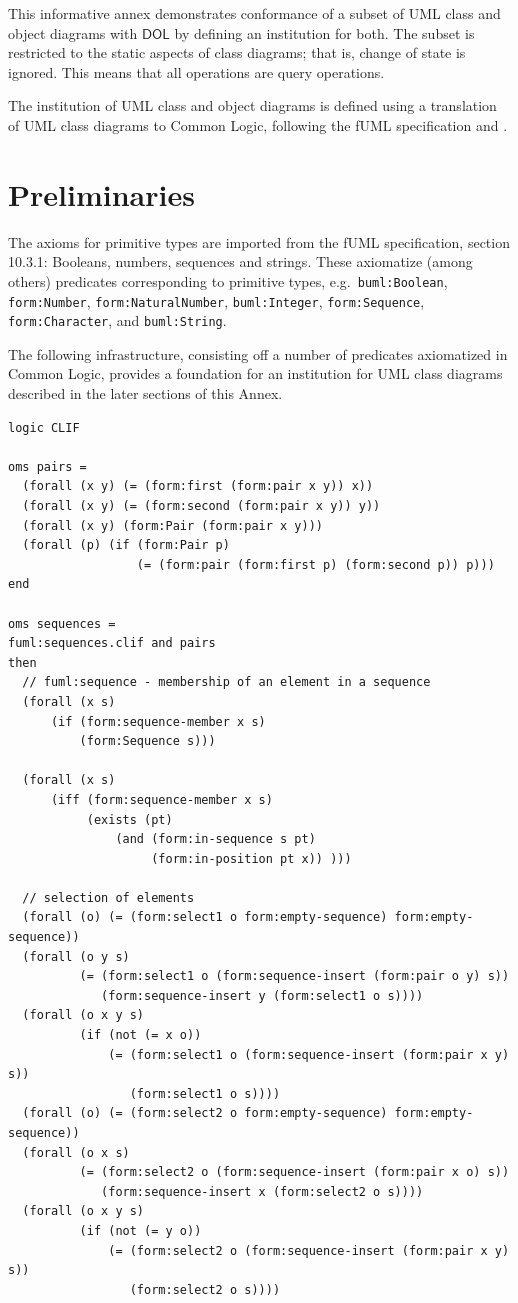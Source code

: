 \documentclass[10pt,fleqn,final]{scrreprt}
\newcommand*{\DOL}{\ensuremath{\mathsf{DOL}}\xspace}
\newenvironment{definitions}[0]{\medskip }{}
\begin{document}
\begin{definitions}
This informative annex demonstrates conformance of a subset of UML class and
object diagrams with \DOL by defining an institution for both.  The subset is restricted to the
 static aspects of class diagrams; that is, change
of state is ignored. This means that all operations are query
operations.

The institution of UML class and object diagrams is defined using a
translation of UML class diagrams to Common Logic, following the fUML
specification and \cite{Seidewitz08}.

\section{Preliminaries}

 The axioms for primitive types
are imported from the fUML specification, section 10.3.1:
Booleans, numbers, sequences and strings.  These
axiomatize (among others) predicates corresponding to primitive types,
e.g.\ \texttt{buml:Boolean}, \texttt{form:Number},
\texttt{form:NaturalNumber}, \texttt{buml:Integer},
\texttt{form:Sequence}, \texttt{form:Character}, and
\texttt{buml:String}.


The following infrastructure, consisting off a number of predicates axiomatized in Common Logic,
provides a foundation for an institution for UML class diagrams described in the later sections of
this Annex. 


\begin{lstlisting}[language=clif,morekeywords={then,with,logic,oms,end},mathescape]
logic CLIF

oms pairs =
  (forall (x y) (= (form:first (form:pair x y)) x))
  (forall (x y) (= (form:second (form:pair x y)) y))
  (forall (x y) (form:Pair (form:pair x y)))
  (forall (p) (if (form:Pair p)
                  (= (form:pair (form:first p) (form:second p)) p)))
end

oms sequences =
fuml:sequences.clif and pairs
then
  // fuml:sequence - membership of an element in a sequence
  (forall (x s)
      (if (form:sequence-member x s)
          (form:Sequence s)))

  (forall (x s)
      (iff (form:sequence-member x s)
           (exists (pt) 
               (and (form:in-sequence s pt)
                    (form:in-position pt x)) )))

  // selection of elements
  (forall (o) (= (form:select1 o form:empty-sequence) form:empty-sequence))
  (forall (o y s)
          (= (form:select1 o (form:sequence-insert (form:pair o y) s)) 
             (form:sequence-insert y (form:select1 o s))))
  (forall (o x y s)
          (if (not (= x o))
              (= (form:select1 o (form:sequence-insert (form:pair x y) s)) 
                 (form:select1 o s))))
  (forall (o) (= (form:select2 o form:empty-sequence) form:empty-sequence))
  (forall (o x s)
          (= (form:select2 o (form:sequence-insert (form:pair x o) s)) 
             (form:sequence-insert x (form:select2 o s))))
  (forall (o x y s)
          (if (not (= y o))
              (= (form:select2 o (form:sequence-insert (form:pair x y) s)) 
                 (form:select2 o s))))


\end{lstlisting}
\end{definitions}
\end{document}
